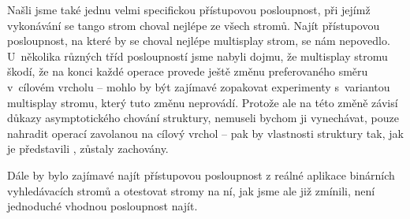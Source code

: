 Našli jsme také jednu velmi specifickou přístupovou posloupnost, při jejímž vykonávání se tango strom choval nejlépe ze všech stromů. Najít přístupovou posloupnost, na které by se choval nejlépe multisplay strom, se nám nepovedlo. U~několika různých tříd posloupností jsme nabyli dojmu, že multisplay stromu škodí, že na konci každé operace  provede ještě změnu preferovaného směru v~cílovém vrcholu -- mohlo by být zajímavé zopakovat experimenty s~variantou multisplay stromu, který tuto změnu neprovádí. Protože ale na této změně závisí důkazy asymptotického chování struktury, nemuseli bychom ji vynechávat, pouze nahradit operací  zavolanou na cílový vrchol -- pak by vlastnosti struktury tak, jak je  představili \citet{multisplay}, zůstaly zachovány.

Dále by bylo zajímavé najít přístupovou posloupnost z reálné aplikace binárních vyhledávacích stromů a otestovat stromy na ní, jak jsme ale již zmínili, není jednoduché vhodnou posloupnost najít.


